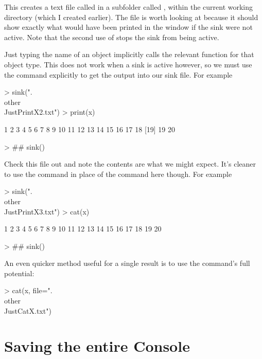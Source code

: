 This creates a text file called  in a subfolder called , within the current working directory (which I created earlier). The file is worth looking at because it should show exactly what would have been printed in the \R{} window if the sink were not active. Note that the second use of  stops the sink from being active.

Just typing the name of an object implicitly calls the relevant  function for that object type. This does not work when a sink is active however, so we must use the  command explicitly to get the output into our sink file. For example
\begin{Schunk}
\begin{Sinput}
> sink(".\\other\\JustPrintX2.txt")
> print(x)
\end{Sinput}
\begin{Soutput}
 [1]  1  2  3  4  5  6  7  8  9 10 11 12 13 14 15 16 17 18
[19] 19 20
\end{Soutput}
\begin{Sinput}
> ## sink()
\end{Sinput}
\end{Schunk}
Check this file out and note the contents are what we might expect. It's cleaner to use the  command in place of the  command here though. For example
\begin{Schunk}
\begin{Sinput}
> sink(".\\other\\JustPrintX3.txt")
> cat(x)
\end{Sinput}
\begin{Soutput}
1 2 3 4 5 6 7 8 9 10 11 12 13 14 15 16 17 18 19 20
\end{Soutput}
\begin{Sinput}
> ## sink()
\end{Sinput}
\end{Schunk}
An even quicker method useful for a single result is to use the  command's full potential:
\begin{Schunk}
\begin{Sinput}
> cat(x, file=".\\other\\JustCatX.txt")
\end{Sinput}
\end{Schunk}


\section{Saving the entire \R{} Console}

